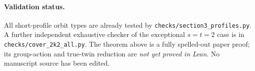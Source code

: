 \documentclass[11pt,a4paper]{article}
\begin{document}
\paragraph{Validation status.}
All short-profile orbit types are already
tested by \texttt{checks/section3\_profiles.py}.
A further independent exhaustive checker of
the exceptional \(s=t=2\) case is in
\texttt{checks/cover\_2k2\_all.py}.
The theorem above is a fully spelled-out
paper proof; its group-action and true-twin
reduction are \emph{not yet proved in Lean}.
No manuscript source has been edited.
\end{document}
